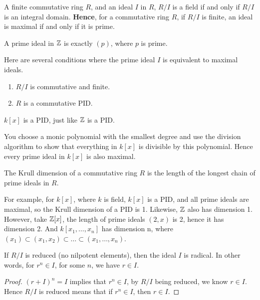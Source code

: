 \begin{example}
    A finite commutative ring $R$, and an ideal $I$ in $R$, $R/I$ is a field if and only if $R/I$ is an integral domain. \textbf{Hence}, for a commutative ring $R$, if $R/I$ is finite, an ideal is maximal if and only if it is prime.
\end{example}
\begin{example}
    A prime ideal in $\mathbb{Z}$ is exactly $(p)$, where $p$ is prime.
\end{example}
\begin{prop}
    Here are several conditions where the prime ideal $I$ is equivalent to maximal ideals.
    \begin{enumerate}
        \item $R/I$ is commutative and finite.
        \item $R$ is a commutative PID.
    \end{enumerate}
\end{prop}

\begin{example}
    $k[x]$ is a PID, just like $\mathbb{Z}$ is a PID.

    You choose a monic polynomial with the smallest degree and use the division algorithm to show that everything in $k[x]$ is divisible by this polynomial. Hence every prime ideal in $k[x]$ is also maximal.
\end{example}

\begin{defn}
    The Krull dimension of a commutative ring $R$ is the length of the longest chain of prime ideals in $R$.
\end{defn}
For example, for $k[x]$, where $k$ is field, $k[x]$ is a PID, and all prime ideals are maximal, so the Krull dimension of a PID is 1. Likewise, $\mathbb{Z}$ also has dimension 1. However, take $\mathbb{Z}[x]$, the length of prime ideals $(2,x)$ is 2, hence it has dimension 2. And $k[x_1, \ldots, x_n]$ has dimension n, where $(x_1)\subset (x_1, x_2)\subset\ldots\subset (x_1, \ldots, x_n)$.

\begin{prop}
    If $R/I$ is reduced (no nilpotent elements), then the ideal $I$ is radical. In other words, for $r^n\in I$, for some $n$, we have $r\in I$.
\end{prop}
\begin{proof}
    $(r+I)^n=I$ implies that $r^n\in I$, by $R/I$ being reduced, we know $r\in I$. Hence $R/I$ is reduced means that if $r^n\in I$, then $r\in I$. 
\end{proof}

